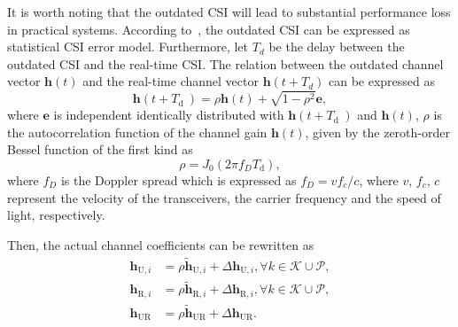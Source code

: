 \documentclass[journal]{IEEEtran}
\begin{document}
It is worth noting that the outdated CSI will lead to substantial performance loss in practical systems. According to~\cite{CSI-error-1}, the outdated CSI can be expressed as statistical CSI error model. Furthermore, let $T_d$ be the delay between the outdated CSI and the real-time CSI. The relation between the outdated channel vector $\bm{h}(t)$ and the real-time channel vector $\bm{h}(t+T_d)$ can be expressed as~\cite{CSI-error-2}
\begin{equation}\label{CSI-error-1}
  \bm{h}\left(t+T_{\text {d }}\right)=\rho \bm{h}(t)+\sqrt{1-\rho^{2}}\bm{e},
\end{equation}
where $\bm{e}$ is independent identically distributed with $\bm{h}\left(t+T_{\text {d }}\right)$ and $\bm{h}(t)$, $\rho $ is the autocorrelation function of the channel gain $\bm{h}(t)$, given by the zeroth-order Bessel function of the first kind as
\begin{equation}\label{CSI-autocorrelation}
  \rho=J_{0}\left(2 \pi f_{D} T_{\mathrm{d}}\right),
\end{equation}
where $f_D$ is the Doppler spread which is expressed as $f_{D}=v f_{c} / c$, where $v$, $f_c$, $c$ represent the velocity of the transceivers, the carrier frequency and the speed of light, respectively.

Then, the actual channel coefficients can be rewritten as 
\begin{equation}\label{CSI-rewritten}
  \begin{aligned}
      \bm{h}_{\mathrm{U}, i} &=\rho\tilde{\bm{h}}_{\mathrm{U}, i}+\Delta \bm{h}_{\mathrm{U}, i}, \forall k \in \mathcal{K}\cup \mathcal{P} ,\\
      \bm{h}_{\mathrm{R}, i} &=\rho\tilde{\bm{h}}_{\mathrm{R}, i}+\Delta \bm{h}_{\mathrm{R}, i}, \forall k \in \mathcal{K}\cup \mathcal{P} ,\\
      \bm{h}_{\mathrm{UR}} &=\rho\tilde{\bm{h}}_{\mathrm{UR}}+\Delta \bm{h}_{\mathrm{UR}}.
  \end{aligned}
\end{equation}
\end{document}
